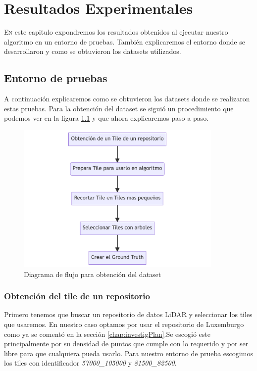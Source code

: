 \chapter{Resultados Experimentales}
\label{chap:Resultados}
\lettrine{E}{n} este capitulo expondremos los resultados obtenidos al ejecutar nuestro algoritmo en un entorno de pruebas. También explicaremos el entorno donde se desarrollaron y como se obtuvieron los datasets utilizados.

\section{Entorno de pruebas}
A continuación explicaremos como se obtuvieron los datasets donde se realizaron estas pruebas. 
Para la obtención del dataset se siguió un procedimiento que podemos ver en la figura \ref{fig:flugdataset} y que ahora explicaremos paso a paso.

\begin{figure}[h]
\centering
    \includegraphics[width=10cm]{imaxes/mermaid-diagram-2023-09-02-195044.png}
    \caption{Diagrama de flujo para obtención del dataset}
    \label{fig:flugdataset}
\end{figure}

\subsection{Obtención del tile de un repositorio}
Primero tenemos que buscar un repositorio de datos LiDAR y seleccionar los tiles que usaremos. En nuestro caso optamos por usar el repositorio de Luxemburgo \cite{luxdata} como ya se comentó en la sección \ref{chap:investigPlan}.Se escogió este principalmente por su densidad de puntos que cumple con lo requerido y por ser libre para que cualquiera pueda usarlo.
Para nuestro entorno de prueba escogimos los tiles con identificador \textit{57000\_105000} y \textit{81500\_82500}.

